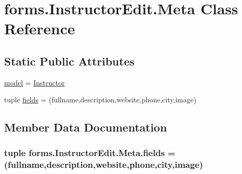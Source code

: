 \hypertarget{classforms_1_1_instructor_edit_1_1_meta}{}\section{forms.\+Instructor\+Edit.\+Meta Class Reference}
\label{classforms_1_1_instructor_edit_1_1_meta}
\subsection*{Static Public Attributes}
\begin{DoxyCompactItemize}
\item 
\hyperlink{classforms_1_1_instructor_edit_1_1_meta_a65b4c8141e3c26664251fd11934e8318}{model} = \hyperlink{classmodels_1_1_instructor}{Instructor}
\item 
tuple \hyperlink{classforms_1_1_instructor_edit_1_1_meta_a15f70139b0265b2e4ecc9f857e04a1cc}{fields} = (\textquotesingle{}fullname\textquotesingle{},\textquotesingle{}description\textquotesingle{},\textquotesingle{}website\textquotesingle{},\textquotesingle{}phone\textquotesingle{},\textquotesingle{}city\textquotesingle{},\textquotesingle{}image\textquotesingle{})
\end{DoxyCompactItemize}


\subsection{Member Data Documentation}
\subsubsection[{\texorpdfstring{fields}{fields}}]{\setlength{\rightskip}{0pt plus 5cm}tuple forms.\+Instructor\+Edit.\+Meta.\+fields = (\textquotesingle{}fullname\textquotesingle{},\textquotesingle{}description\textquotesingle{},\textquotesingle{}website\textquotesingle{},\textquotesingle{}phone\textquotesingle{},\textquotesingle{}city\textquotesingle{},\textquotesingle{}image\textquotesingle{})\hspace{0.3cm}{\ttfamily [static]}}\hypertarget{classforms_1_1_instructor_edit_1_1_meta_a15f70139b0265b2e4ecc9f857e04a1cc}{}\label{classforms_1_1_instructor_edit_1_1_meta_a15f70139b0265b2e4ecc9f857e04a1cc}

